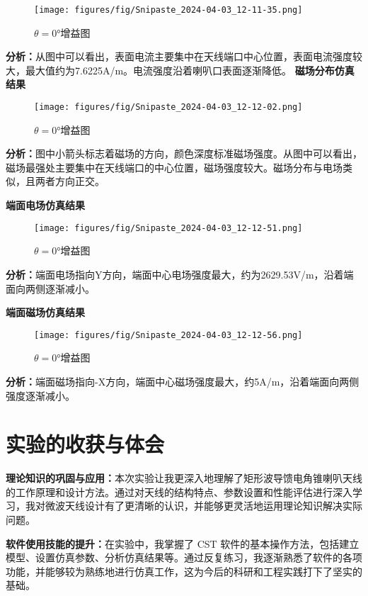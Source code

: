 \documentclass[12pt,hyperref,a4paper,UTF8]{ctexart}
\begin{document}
\begin{figure}[H]
    \centering
    \texttt{[image: figures/fig/Snipaste\_2024-04-03\_12-11-35.png]}
    \caption{$\theta=0°$增益图}
    \label{fig:enter-label}
\end{figure}


\textbf{分析：}从图中可以看出，表面电流主要集中在天线端口中心位置，表面电流强度较大，最大值约为7.6225A/m。电流强度沿着喇叭口表面逐渐降低。
\textbf{磁场分布仿真结果}
\begin{figure}[H]
    \centering
    \texttt{[image: figures/fig/Snipaste\_2024-04-03\_12-12-02.png]}
    \caption{$\theta=0°$增益图}
    \label{fig:enter-label}
\end{figure}

\textbf{分析：}图中小箭头标志着磁场的方向，颜色深度标准磁场强度。从图中可以看出，磁场最强处主要集中在天线端口的中心位置，磁场强度较大。磁场分布与电场类似，且两者方向正交。

\textbf{端面电场仿真结果}
\begin{figure}[H]
    \centering
    \texttt{[image: figures/fig/Snipaste\_2024-04-03\_12-12-51.png]}
    \caption{$\theta=0°$增益图}
    \label{fig:enter-label}
\end{figure}

\textbf{分析：}端面电场指向Y方向，端面中心电场强度最大，约为2629.53V/m，沿着端面向两侧逐渐减小。


\newpage
\textbf{端面磁场仿真结果}
\begin{figure}[H]
    \centering
    \texttt{[image: figures/fig/Snipaste\_2024-04-03\_12-12-56.png]}
    \caption{$\theta=0°$增益图}
    \label{fig:enter-label}
\end{figure}
\textbf{分析：}端面磁场指向-X方向，端面中心磁场强度最大，约5A/m，沿着端面向两侧强度逐渐减小。

\section{实验的收获与体会}


\textbf{理论知识的巩固与应用：}本次实验让我更深入地理解了矩形波导馈电角锥喇叭天线的工作原理和设计方法。通过对天线的结构特点、参数设置和性能评估进行深入学习，我对微波天线设计有了更清晰的认识，并能够更灵活地运用理论知识解决实际问题。

\textbf{软件使用技能的提升：}在实验中，我掌握了 CST 软件的基本操作方法，包括建立模型、设置仿真参数、分析仿真结果等。通过反复练习，我逐渐熟悉了软件的各项功能，并能够较为熟练地进行仿真工作，这为今后的科研和工程实践打下了坚实的基础。
\end{document}
